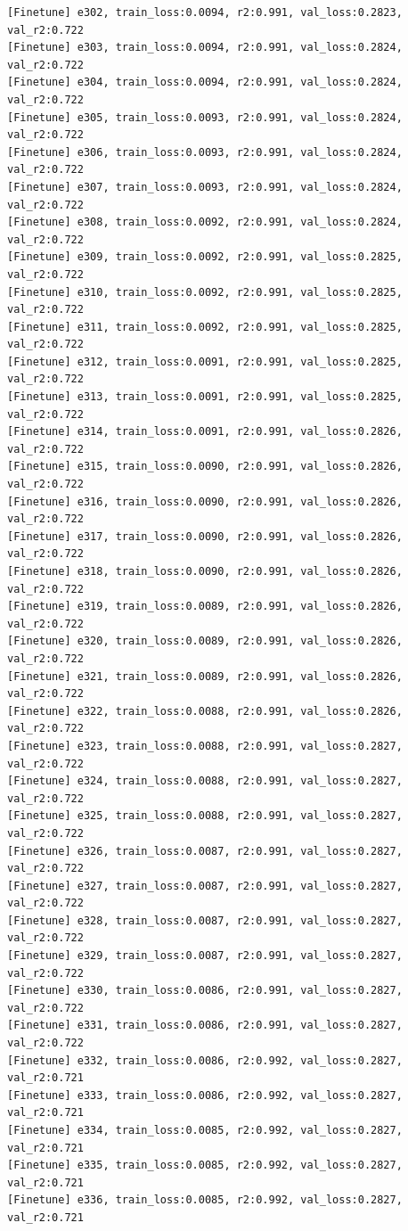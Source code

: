 \documentclass[a4paper, 12pt]{article}
\begin{document}
\begin{lstlisting}
[Finetune] e302, train_loss:0.0094, r2:0.991, val_loss:0.2823, val_r2:0.722
[Finetune] e303, train_loss:0.0094, r2:0.991, val_loss:0.2824, val_r2:0.722
[Finetune] e304, train_loss:0.0094, r2:0.991, val_loss:0.2824, val_r2:0.722
[Finetune] e305, train_loss:0.0093, r2:0.991, val_loss:0.2824, val_r2:0.722
[Finetune] e306, train_loss:0.0093, r2:0.991, val_loss:0.2824, val_r2:0.722
[Finetune] e307, train_loss:0.0093, r2:0.991, val_loss:0.2824, val_r2:0.722
[Finetune] e308, train_loss:0.0092, r2:0.991, val_loss:0.2824, val_r2:0.722
[Finetune] e309, train_loss:0.0092, r2:0.991, val_loss:0.2825, val_r2:0.722
[Finetune] e310, train_loss:0.0092, r2:0.991, val_loss:0.2825, val_r2:0.722
[Finetune] e311, train_loss:0.0092, r2:0.991, val_loss:0.2825, val_r2:0.722
[Finetune] e312, train_loss:0.0091, r2:0.991, val_loss:0.2825, val_r2:0.722
[Finetune] e313, train_loss:0.0091, r2:0.991, val_loss:0.2825, val_r2:0.722
[Finetune] e314, train_loss:0.0091, r2:0.991, val_loss:0.2826, val_r2:0.722
[Finetune] e315, train_loss:0.0090, r2:0.991, val_loss:0.2826, val_r2:0.722
[Finetune] e316, train_loss:0.0090, r2:0.991, val_loss:0.2826, val_r2:0.722
[Finetune] e317, train_loss:0.0090, r2:0.991, val_loss:0.2826, val_r2:0.722
[Finetune] e318, train_loss:0.0090, r2:0.991, val_loss:0.2826, val_r2:0.722
[Finetune] e319, train_loss:0.0089, r2:0.991, val_loss:0.2826, val_r2:0.722
[Finetune] e320, train_loss:0.0089, r2:0.991, val_loss:0.2826, val_r2:0.722
[Finetune] e321, train_loss:0.0089, r2:0.991, val_loss:0.2826, val_r2:0.722
[Finetune] e322, train_loss:0.0088, r2:0.991, val_loss:0.2826, val_r2:0.722
[Finetune] e323, train_loss:0.0088, r2:0.991, val_loss:0.2827, val_r2:0.722
[Finetune] e324, train_loss:0.0088, r2:0.991, val_loss:0.2827, val_r2:0.722
[Finetune] e325, train_loss:0.0088, r2:0.991, val_loss:0.2827, val_r2:0.722
[Finetune] e326, train_loss:0.0087, r2:0.991, val_loss:0.2827, val_r2:0.722
[Finetune] e327, train_loss:0.0087, r2:0.991, val_loss:0.2827, val_r2:0.722
[Finetune] e328, train_loss:0.0087, r2:0.991, val_loss:0.2827, val_r2:0.722
[Finetune] e329, train_loss:0.0087, r2:0.991, val_loss:0.2827, val_r2:0.722
[Finetune] e330, train_loss:0.0086, r2:0.991, val_loss:0.2827, val_r2:0.722
[Finetune] e331, train_loss:0.0086, r2:0.991, val_loss:0.2827, val_r2:0.722
[Finetune] e332, train_loss:0.0086, r2:0.992, val_loss:0.2827, val_r2:0.721
[Finetune] e333, train_loss:0.0086, r2:0.992, val_loss:0.2827, val_r2:0.721
[Finetune] e334, train_loss:0.0085, r2:0.992, val_loss:0.2827, val_r2:0.721
[Finetune] e335, train_loss:0.0085, r2:0.992, val_loss:0.2827, val_r2:0.721
[Finetune] e336, train_loss:0.0085, r2:0.992, val_loss:0.2827, val_r2:0.721

\end{lstlisting}
\end{document}
